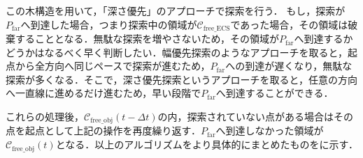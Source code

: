 \documentclass[a4paper,twoside,12pt,papersize, dvipdfmx]{iirthesis}
\begin{document}
この木構造を用いて，「深さ優先」のアプローチで探索を行う．
もし，探索が$P_{\mathrm {far}}$へ到達した場合，つまり探索中の領域が$\mathcal{C}_{\mathrm{free\_ECS}}$であった場合，その領域は破棄することとなる．無駄な探索を増やさないため，その領域が$P_{\mathrm {far}}$へ到達するかどうかはなるべく早く判断したい．幅優先探索のようなアプローチを取ると，起点から全方向へ同じペースで探索が進むため，$P_{\mathrm {far}}$への到達が遅くなり，無駄な探索が多くなる．そこで，深さ優先探索というアプローチを取ると，任意の方向へ一直線に進めるだけ進むため，早い段階で$P_{\mathrm {far}}$へ到達することができる．\par

これらの処理後，$\mathcal{C}_{\mathrm{free\_obj}}(t-\Delta t)$の内，探索されていない点がある場合はその点を起点として上記の操作を再度繰り返す．$P_{\mathrm {far}}$へ到達しなかった領域が$\mathcal{C}_{\mathrm{free\_obj}}(t)$となる．以上のアルゴリズムをより具体的にまとめたものをに示す．
\end{document}
